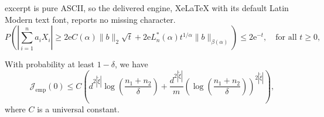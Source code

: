 \documentclass[10pt,a4paper]{amsart}
\begin{document}
excerpt is pure ASCII, so the delivered engine, XeLaTeX with its default Latin Modern text font, reports no missing character.
\begin{equation}
    P\left(\left|\sum_{i=1}^{n} a_i X_i\right| \geq 2\mathrm{e}C(\alpha)\|b\|_2\sqrt{t} + 2\mathrm{e}L_n^{*}(\alpha)t^{1/\alpha}\|b\|_{\beta(\alpha)}\right) \leq 2\mathrm{e}^{-t},\quad \text{for all } t \geq 0,\label{eq:consen_ineq}
\end{equation}

\begin{lemma}\label{lem:initial_loss}
	With probability at least $1-\delta$, we have
	\begin{equation}
		\mathcal{J}_{\text{emp}}(0)\leq C\left( d^{2|\tilde{\xi}|}\log\left(\frac{n_1+n_2}{\delta}\right)+\frac{d^{2|\tilde{\xi}|}}{m} \left(\log\left(\frac{n_1+n_2}{\delta}\right)\right)^{2|\tilde{\xi}|}  \right),
	\end{equation}
	where $C$ is a universal constant.
\end{lemma}
\end{document}
